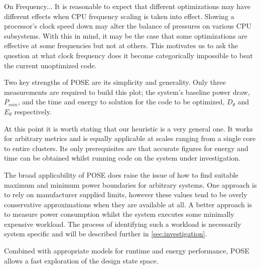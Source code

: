 


On Frequency...
It is reasonable to expect that different optimizations may have different effects when CPU frequency scaling is taken into effect. Slowing a processor's clock speed down may alter the balance of pressures on various CPU subsystems. With this in mind, it may be the case that some optimizations are effective at some frequencies but not at others. This motivates us to ask the question at what clock frequency does it become categorically impossible to beat the current unoptimized code.

\todo{} Two key strengths of POSE are its simplicity and generality.
Only three measurements are required to build this plot; the system's baseline power draw, $P_{min}$, and the time and energy to solution for the code to be optimized, $D_\theta$ and $E_\theta$ respectively.



\todo{} At this point it is worth stating that our heuristic is a very general one.
It works for arbitrary metrics and is equally applicable at scales ranging from a single core to entire clusters.
Its only prerequisites are that accurate figures for energy and time can be obtained whilst running code on the system under investigation.

The broad applicability of POSE does raise the issue of how to find suitable maximum and minimum power boundaries for arbitrary systems. 
One approach is to rely on manufacturer supplied limits, however these values tend to be overly conservative approximations when they are available at all.
A better approach is to measure power consumption whilst the system executes some minimally expensive workload. 
The process of identifying such a workload is necessarily system specific and will be described further in \autoref{sec:investigation}.

Combined with appropriate models for runtime and energy performance, POSE allows a fast exploration of the design state space.
